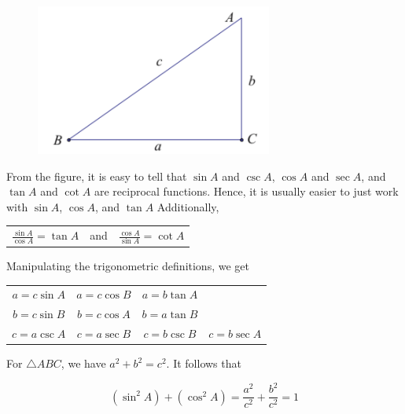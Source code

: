 \documentclass{article}
\begin{document}
            \begin{figure} [h]
                \centering
                \includegraphics [scale=0.4] {Resources/Unit2Trig/Trig.fig1.png}
            \end{figure}

            \noindent From the figure, it is easy to tell that $\sin A$ and $\csc A$, $\cos A$ and
            $\sec A$, and $\tan A$ and $\cot A$ are reciprocal functions. Hence, it is usually
            easier to just work with $\sin A$, $\cos A$, and $\tan A$ Additionally,

            \begin{center}
                \begin{tabular}{ccc}
                    $\frac{\sin A}{\cos A}=\tan A$
                    & and &
                    $\frac{\cos A}{\sin A}=\cot A$
                \end{tabular}
            \end{center}

            \noindent Manipulating the trigonometric definitions, we get

            \begin{center}
                \begin{tabular}{cccc}
                    $a=c\sin A$
                    & $a=c\cos B$
                    & $a = b\tan A$ & \\
                    $b=c\sin B$
                    & $b=c\cos A$
                    & $b=a\tan B$ & \\
                    $c=a\csc A$
                    & $c=a\sec B$
                    & $c=b\csc B$
                    & $c=b\sec A$
                \end{tabular}
            \end{center}

            \noindent For $\triangle ABC$, we have $a^2+b^2=c^2$. It follows that

            \begin{equation*}
                (\sin ^2 A) + (\cos ^2 A) = \frac{a^2}{c^2} + \frac{b^2}{c^2}=1
            \end{equation*}
\end{document}
